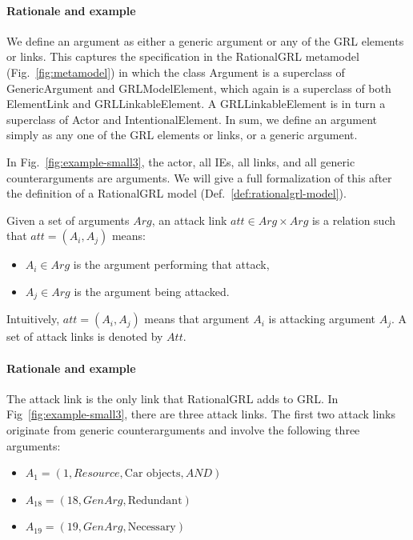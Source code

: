 \paragraph{Rationale and example} We define an argument as either a generic argument or any of the GRL elements or links. This captures the specification in the RationalGRL metamodel (Fig.~\ref{fig:metamodel}) in which the class \textsf{Argument} is a superclass of \textsf{GenericArgument} and \textsf{GRLModelElement}, which again is a superclass of both \textsf{ElementLink} and \textsf{GRLLinkableElement}. A \textsf{GRLLinkableElement} is in turn a superclass of \textsf{Actor} and \textsf{IntentionalElement}. In sum, we define an argument simply as any one of the GRL elements or links, or a generic argument.

In Fig.~\ref{fig:example-small3}, the actor, all IEs, all links, and all generic counterarguments are arguments. We will give a full formalization of this after the definition of a RationalGRL model (Def.~\ref{def:rationalgrl-model}).

\begin{definition}
\label{def:link:attack}
Given a set of arguments $Arg$, an attack link $att\in Arg\times Arg$ is a relation such that $att=(A_i,A_j)$ means:
\begin{itemize}
\item $A_i\in Arg$ is the argument performing that attack,
\item $A_j\in Arg$ is the argument being attacked.
\end{itemize}
Intuitively, $att=(A_i,A_j)$ means that argument $A_i$ is attacking argument $A_j$. A set of attack links is denoted by $Att$.
\end{definition}

\paragraph{Rationale and example} The attack link is the only link that RationalGRL adds to GRL. In Fig~\ref{fig:example-small3}, there are three attack links. The first two attack links originate from generic counterarguments and involve the following three arguments:
\begin{itemize}
\item $A_1 = (1, Resource, \text{Car objects}, AND)$
\item $A_{18} = (18, GenArg, \text{Redundant})$
\item $A_{19} = (19, GenArg, \text{Necessary})$
\end{itemize}


